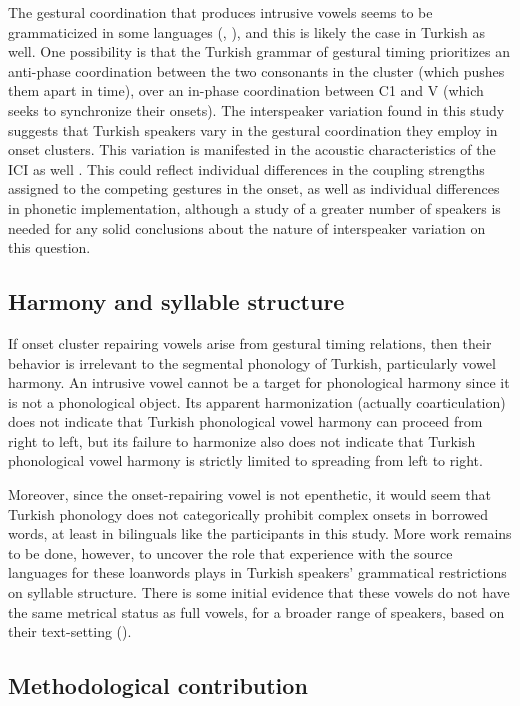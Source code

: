 \documentclass[output=paper,colorlinks,citecolor=brown]{langscibook}
\begin{document}
The gestural coordination that produces intrusive vowels seems to be grammaticized in some languages (\citealt{Gafos2002}, \citealt{Hall:2003}), and this is likely the case in Turkish as well. One possibility is that the Turkish grammar of gestural timing prioritizes an anti-phase coordination between the two consonants in the cluster (which pushes them apart in time), over an in-phase coordination between C1 and V (which seeks to synchronize their onsets). The interspeaker variation found in this study suggests that Turkish speakers vary in the gestural coordination they employ in onset clusters. This variation is manifested in the acoustic characteristics of the ICI as well \citep{Bellik2018}. This could reflect individual differences in the coupling strengths assigned to the competing gestures in the onset, as well as individual differences in phonetic implementation, although a study of a greater number of speakers is needed for any solid conclusions about the nature of interspeaker variation on this question.

\subsection{Harmony and syllable structure}
\largerpage
If onset cluster repairing vowels arise from gestural timing relations, then their behavior is irrelevant to the segmental phonology of Turkish, particularly vowel harmony. An intrusive vowel cannot be a target for phonological harmony since it is not a phonological object. Its apparent harmonization (actually coarticulation) does not indicate that Turkish phonological vowel harmony can proceed from right to left, but its failure to harmonize also does not indicate that Turkish phonological vowel harmony is strictly limited to spreading from left to right.

Moreover, since the onset-repairing vowel is not epenthetic, it would seem that Turkish phonology does not categorically prohibit complex onsets in borrowed words, at least in bilinguals like the participants in this study. More work remains to be done, however, to uncover the role that experience with the source languages for these loanwords plays in Turkish speakers' grammatical restrictions on syllable structure. There is some initial evidence that these vowels do not have the same metrical status as full vowels, for a broader range of speakers, based on their text-setting (\citealt[ch.6]{Bellik2019a}).

\subsection{Methodological contribution}
\end{document}

